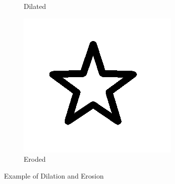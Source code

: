 \begin{figure}[ht]
\begin{subfigure}{.33\textwidth}
        \caption{Dilated}
    \end{subfigure}%
    \begin{subfigure}{.33\textwidth}
        \centering
        \includegraphics[width=.99\linewidth]{images/literature/morphological/erosion}
        \caption{Eroded}
    \end{subfigure}
    \caption{Example of Dilation and Erosion}
    \label{fig:star_dilate_erode}
\end{figure}


